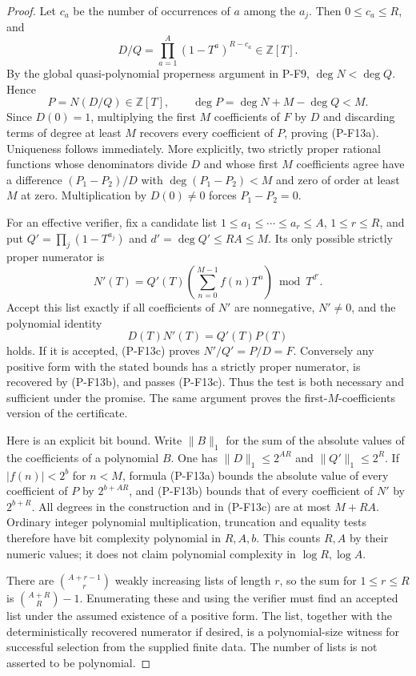 \begin{proof}
Let $c_a$ be the number of occurrences of $a$ among the $a_j$.
Then $0\le c_a\le R$, and
\[
 D/Q=\prod_{a=1}^{A}(1-T^a)^{R-c_a}\in\mathbb Z[T].
\]
By the global quasi-polynomial properness argument in P-F9,
$\deg N<\deg Q$. Hence
\[
 P=N(D/Q)\in\mathbb Z[T],\qquad
 \deg P=\deg N+M-\deg Q<M.
\]
Since $D(0)=1$, multiplying the first $M$ coefficients of $F$ by $D$
and discarding terms of degree at least $M$ recovers every coefficient
of $P$, proving (P-F13a). Uniqueness follows immediately. More
explicitly, two strictly proper rational functions whose denominators
divide $D$ and whose first $M$ coefficients agree have a difference
$(P_1-P_2)/D$ with $\deg(P_1-P_2)<M$ and zero of order at least $M$
at zero. Multiplication by $D(0)\ne0$ forces $P_1-P_2=0$.

For an effective verifier, fix a candidate list
$1\le a_1\le\cdots\le a_r\le A$, $1\le r\le R$, and put
$Q'=\prod_j(1-T^{a_j})$ and $d'=\deg Q'\le RA\le M$.
Its only possible strictly proper numerator is
\[
 N'(T)=Q'(T)\left(\sum_{n=0}^{M-1}f(n)T^n\right)\bmod T^{d'}.
 \tag{P-F13b}
\]
Accept this list exactly if all coefficients of $N'$ are nonnegative,
$N'\ne0$, and the polynomial identity
\[
 D(T)N'(T)=Q'(T)P(T)
 \tag{P-F13c}
\]
holds. If it is accepted, (P-F13c) proves $N'/Q'=P/D=F$.
Conversely any positive form with the stated bounds has a strictly
proper numerator, is recovered by (P-F13b), and passes (P-F13c).
Thus the test is both necessary and sufficient under the promise.
The same argument proves the first-$M$-coefficients version of the
certificate.

Here is an explicit bit bound. Write $\|B\|_1$ for the sum of the
absolute values of the coefficients of a polynomial $B$. One has
$\|D\|_1\le2^{AR}$ and $\|Q'\|_1\le2^R$. If
$|f(n)|<2^b$ for $n<M$, formula (P-F13a) bounds the absolute value
of every coefficient of $P$ by $2^{b+AR}$, and (P-F13b) bounds that
of every coefficient of $N'$ by $2^{b+R}$. All degrees in the
construction and in (P-F13c) are at most $M+RA$. Ordinary integer
polynomial multiplication, truncation and equality tests therefore
have bit complexity polynomial in $R,A,b$. This counts $R,A$ by
their numeric values; it does not claim polynomial complexity in
$\log R,\log A$.

There are $\binom{A+r-1}{r}$ weakly increasing lists of length $r$,
so the sum for $1\le r\le R$ is $\binom{A+R}{R}-1$.
Enumerating these and using the verifier must find an accepted list
under the assumed existence of a positive form. The list, together
with the deterministically recovered numerator if desired, is a
polynomial-size witness for successful selection from the supplied
finite data. The number of lists is not asserted to be polynomial.
\end{proof}

